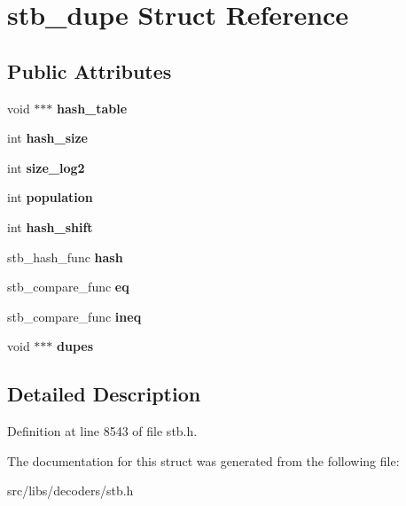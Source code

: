 \hypertarget{structstb__dupe}{\section{stb\-\_\-dupe Struct Reference}
\label{structstb__dupe}
}
\subsection*{Public Attributes}
\begin{DoxyCompactItemize}
\item 
\hypertarget{structstb__dupe_a3190e0c8a4e80faac34e602b091c701a}{void $\ast$$\ast$$\ast$ {\bfseries hash\-\_\-table}}\label{structstb__dupe_a3190e0c8a4e80faac34e602b091c701a}

\item 
\hypertarget{structstb__dupe_af78a91edcb8f7c5b04c298901b681ff1}{int {\bfseries hash\-\_\-size}}\label{structstb__dupe_af78a91edcb8f7c5b04c298901b681ff1}

\item 
\hypertarget{structstb__dupe_af33ab09b9ca1ec49a01e240e8c771687}{int {\bfseries size\-\_\-log2}}\label{structstb__dupe_af33ab09b9ca1ec49a01e240e8c771687}

\item 
\hypertarget{structstb__dupe_a919fd05ace44a8175d1c3d2975ae52b2}{int {\bfseries population}}\label{structstb__dupe_a919fd05ace44a8175d1c3d2975ae52b2}

\item 
\hypertarget{structstb__dupe_a3854a8d4f4e46fdcc5c5041361160d8e}{int {\bfseries hash\-\_\-shift}}\label{structstb__dupe_a3854a8d4f4e46fdcc5c5041361160d8e}

\item 
\hypertarget{structstb__dupe_a6abcb39ad7f7e2de734086c8f344c717}{stb\-\_\-hash\-\_\-func {\bfseries hash}}\label{structstb__dupe_a6abcb39ad7f7e2de734086c8f344c717}

\item 
\hypertarget{structstb__dupe_a9331ba447a7ad8799400dde065274e23}{stb\-\_\-compare\-\_\-func {\bfseries eq}}\label{structstb__dupe_a9331ba447a7ad8799400dde065274e23}

\item 
\hypertarget{structstb__dupe_a70d2f3b73f6e22f62acc82acadf8e054}{stb\-\_\-compare\-\_\-func {\bfseries ineq}}\label{structstb__dupe_a70d2f3b73f6e22f62acc82acadf8e054}

\item 
\hypertarget{structstb__dupe_af5f211456f48da1134e89541c225dbe6}{void $\ast$$\ast$$\ast$ {\bfseries dupes}}\label{structstb__dupe_af5f211456f48da1134e89541c225dbe6}

\end{DoxyCompactItemize}


\subsection{Detailed Description}


Definition at line 8543 of file stb.\-h.



The documentation for this struct was generated from the following file\-:\begin{DoxyCompactItemize}
\item 
src/libs/decoders/stb.\-h\end{DoxyCompactItemize}
